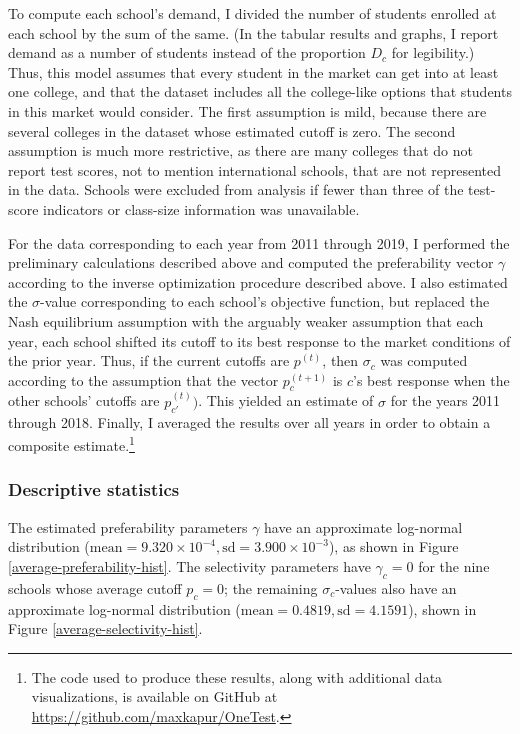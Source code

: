 \documentclass[12pt]{article}
\numberwithin{equation}{subsection}
\theoremstyle{definition}
\begin{document}
To compute each school's demand, I divided the number of students enrolled at each school by the sum of the same. (In the tabular results and graphs, I report demand as a number of students instead of the proportion $D_c$ for legibility.) Thus, this model assumes that every student in the market can get into at least one college, and that the dataset includes all the college-like options that students in this market would consider. The first assumption is mild, because there are several colleges in the dataset whose estimated cutoff is zero. The second assumption is much more restrictive, as there are many colleges that do not report test scores, not to mention international schools, that are not represented in the data. Schools were excluded from analysis if fewer than three of the test-score indicators or class-size information was unavailable. 

For the data corresponding to each year from 2011 through 2019, I performed the preliminary calculations described above and computed the preferability vector $\gamma$ according to the inverse optimization procedure described above. I also estimated the $\sigma$-value corresponding to each school's objective function, but replaced the Nash equilibrium assumption with the arguably weaker assumption that each year, each school shifted its cutoff to its best response to the market conditions of the prior year. Thus, if the current cutoffs are $p^{(t)}$, then $\sigma_c$ was computed according to the assumption that the vector $p_c^{(t+1)}$ is $c$'s best response when the other schools' cutoffs are $p_{c'}^{(t)})$. This yielded an estimate of $\sigma$ for the years 2011 through 2018. Finally, I averaged the results over all years in order to obtain a composite estimate.\footnote{The code used to produce these results, along with additional data visualizations, is available on GitHub at \url{https://github.com/maxkapur/OneTest}.}

\subsubsection{Descriptive statistics}
The estimated preferability parameters $\gamma$ have an approximate log-normal distribution ($\text{mean} = 9.320 \times 10^{-4}, \text{sd} = 3.900 \times 10^{-3}$), as shown in Figure \ref{average-preferability-hist}. The selectivity parameters have $\gamma_c = 0$ for the nine schools whose average cutoff $p_c = 0$; the remaining $\sigma_c$-values also have an approximate log-normal distribution ($\text{mean} = 0.4819, \text{sd} = 4.1591$), shown in Figure \ref{average-selectivity-hist}.
\end{document}
